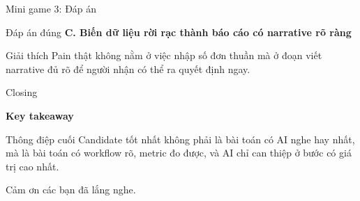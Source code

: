 \documentclass[aspectratio=169,11pt]{beamer}
\begin{document}
\begin{frame}{Mini game 3: Đáp án}
  \begin{block}{Đáp án đúng}
    \textbf{C. Biến dữ liệu rời rạc thành báo cáo có narrative rõ ràng}
  \end{block}

  \begin{block}{Giải thích}
    Pain thật không nằm ở việc nhập số đơn thuần mà ở đoạn viết narrative đủ rõ để người nhận có thể ra quyết định ngay.
  \end{block}
\end{frame}

\begin{frame}{Closing}
  \begin{center}
    \Large \textbf{Key takeaway}
  \end{center}

  \vspace{0.2cm}
  \begin{block}{Thông điệp cuối}
    Candidate tốt nhất không phải là bài toán có AI nghe hay nhất, mà là bài toán có workflow rõ, metric đo được, và AI chỉ can thiệp ở bước có giá trị cao nhất.
  \end{block}

  \vspace{0.2cm}
  \begin{center}
    Cảm ơn các bạn đã lắng nghe.
  \end{center}
\end{frame}
\end{document}
